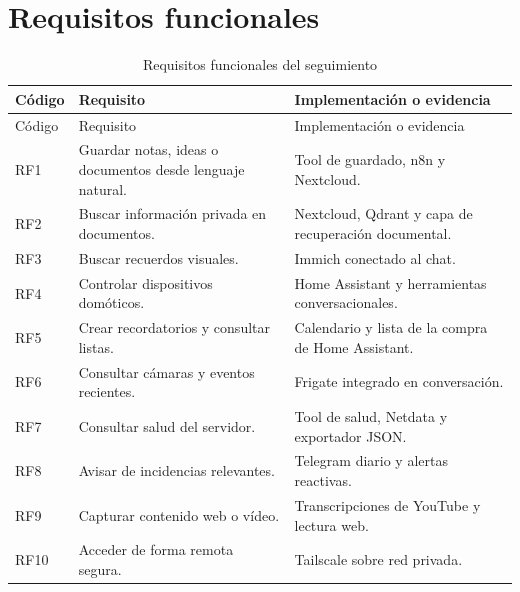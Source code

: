 \section{Requisitos funcionales}
\begin{longtable}{p{}p{}p{}}
  \caption{Requisitos funcionales del seguimiento}
  \label{tab:requisitos-funcionales-seguimiento}\\
  \toprule
  Código & Requisito & Implementación o evidencia \\
  \midrule
  \endfirsthead
  \toprule
  Código & Requisito & Implementación o evidencia \\
  \midrule
  \endhead
  \bottomrule
  \endfoot
  RF1 & Guardar notas, ideas o documentos desde lenguaje natural. & Tool de guardado, n8n y Nextcloud. \\
  RF2 & Buscar información privada en documentos. & Nextcloud, Qdrant y capa de recuperación documental. \\
  RF3 & Buscar recuerdos visuales. & Immich conectado al chat. \\
  RF4 & Controlar dispositivos domóticos. & Home Assistant y herramientas conversacionales. \\
  RF5 & Crear recordatorios y consultar listas. & Calendario y lista de la compra de Home Assistant. \\
  RF6 & Consultar cámaras y eventos recientes. & Frigate integrado en conversación. \\
  RF7 & Consultar salud del servidor. & Tool de salud, Netdata y exportador JSON. \\
  RF8 & Avisar de incidencias relevantes. & Telegram diario y alertas reactivas. \\
  RF9 & Capturar contenido web o vídeo. & Transcripciones de YouTube y lectura web. \\
  RF10 & Acceder de forma remota segura. & Tailscale sobre red privada. \\
  \bottomrule
\end{longtable}

